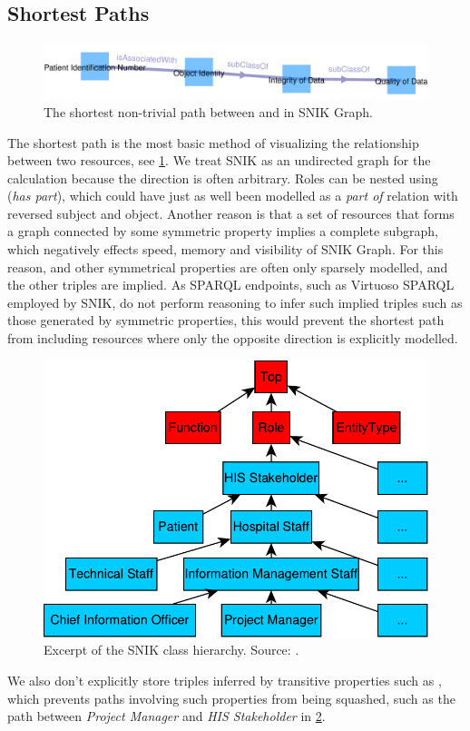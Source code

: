 \documentclass[conference]{IEEEtran}
\begin{document}
\subsection{Shortest Paths}
\begin{figure}[h!]
    \centering
    \includegraphics[width=\linewidth]{path.png}
    \caption{The shortest non-trivial path between  and  in SNIK Graph.}
	\label{fig:path}
\end{figure}
\vspace{-3pt}
The shortest path is the most basic method of visualizing the relationship between two resources, see \cref{fig:path}.
We treat SNIK as an undirected graph for the calculation because the direction is often arbitrary.
Roles can be nested using  (\emph{has part}), which could have just as well been modelled as a \emph{part of} relation with reversed subject and object.
Another reason is that a set of resources that forms a graph connected by some symmetric property implies a complete subgraph, which negatively effects speed, memory and visibility of SNIK Graph.
For this reason,  and other symmetrical properties are often only sparsely modelled, and the other triples are implied.
As SPARQL endpoints, such as Virtuoso SPARQL employed by SNIK, do not perform reasoning to infer such implied triples such as those generated by symmetric properties, this would prevent the shortest path from including resources where only the opposite direction is explicitly modelled.%
\begin{figure}[h]
    \centering
    \includegraphics[width=0.8\columnwidth]{hierarchy.pdf}
    \caption{Excerpt of the SNIK class hierarchy. Source: \cite{snikposter}.}
	\label{fig:hierarchy}
\end{figure}
\vspace{-3pt}
We also don't explicitly store triples inferred by transitive properties such as , which prevents paths involving such properties from being squashed, such as the path between \emph{Project Manager} and \emph{HIS Stakeholder} in \cref{fig:hierarchy}.
\end{document}
